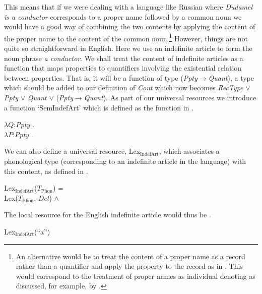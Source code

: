 This means that if we were dealing with a language like Russian where
\textit{Dudamel is a conductor} corresponds to a proper name followed
by a common noun we would have a good way of combining the two
contents by applying the content of the proper name to the content of
the common noun.\footnote{An alternative would be to treat the content
  of a proper name as a record rather than a quantifier and apply the
  property to the record as in .  This would correspond to
  the treatment of proper names as individual denoting as discussed,
  for example, by \cite{Partee1986}.} However, things are not quite so
straightforward in English.  Here we use an indefinite article to form
the noun phrase \textit{a conductor}.  We shall treat the content of
indefinite articles as a function that maps properties to quantifiers
involving the existential relation between properties.  That is, it
will be a function of type (\textit{Ppty}$\rightarrow$\textit{Quant}),
a type which should be added to our definition of \textit{Cont} which
now becomes \textit{RecType}
$\vee$ \textit{Ppty} $\vee$ \textit{Quant} $\vee$
(\textit{Ppty}$\rightarrow$\textit{Quant}).  As part of our
universal resources we introduce a function `SemIndefArt' which is
defined as the function in \nexteg{}.
\begin{ex} 
$\lambda Q$:\textit{Ppty} . \\
\hspace*{1em} $\lambda P$:\textit{Ppty}
. 
\label{ex:semindefart}
\end{ex} 
We can also define a universal resource, Lex$_{\mathrm{IndefArt}}$, which associates a
phonological type (corresponding to an indefinite article in the
language) with this content, as defined in \nexteg{}.
\begin{ex} 
Lex$_{\mathrm{IndefArt}}$($T_{\mathrm{Phon}}$) = \\
\hspace*{1em} Lex($T_{\mathrm{Phon}}$, \textit{Det}) \d{$\wedge$}  
\end{ex} 
The local resource for the English indefinite article would thus be
\nexteg{}.
\begin{ex} 
Lex$_{\mathrm{IndefArt}}$(``a'') 
\end{ex} 

